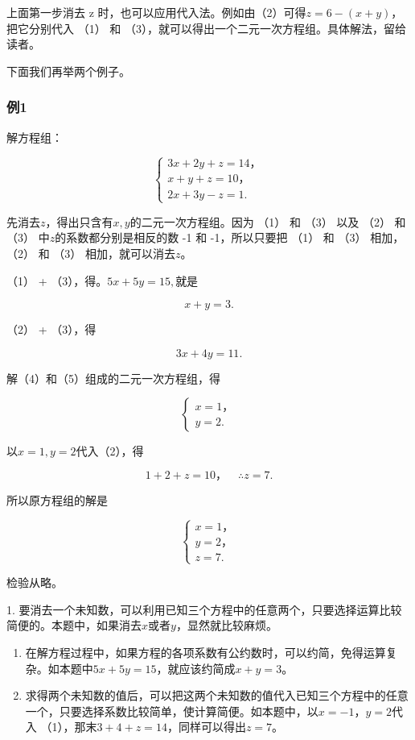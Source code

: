  上面第一步消去 z
时，也可以应用代入法。例如由（2）可得\(z=6-(x+y)\)，把它分别代入 （1）
和 （3），就可以得出一个二元一次方程组。具体解法，留给读者。

下面我们再举两个例子。

\subsubsection{例1}

解方程组：

\[
\left\{ \begin{array}{l} 3 x + 2 y + z = 14\text{，} \\ x + y + z = 10\text{，} \\ 2 x + 3 y - z = 1. \end{array} \right. \tag{1}
\]

 先消去\(z\)，得出只含有\(x, y\)的二元一次方程组。因为
（1） 和 （3） 以及 （2） 和 （3） 中\(z\)的系数都分别是相反的数 -1 和
-1，所以只要把 （1） 和 （3） 相加，（2） 和 （3）
相加，就可以消去\(z\)。

 （1） + （3），得。\(5x + 5y = 15,\)就是

\[
x + y = 3. \tag{4}
\]

（2） + （3），得

\[
3 x + 4 y = 11. \tag{5}
\]

解（4）和（5）组成的二元一次方程组，得

\[
\left\{ \begin{array}{l} x = 1\text{，} \\ y = 2. \end{array} \right.
\]

以\(x = 1, y = 2\)代入（2），得

\[
1 + 2 + z = 10\text{，} \quad \therefore z = 7.
\]

所以原方程组的解是

\[
\left\{ \begin{array}{l} x = 1\text{，} \\ y = 2\text{，} \\ z = 7. \end{array} \right.
\]

检验从略。

 1.
要消去一个未知数，可以利用已知三个方程中的任意两个，只要选择运算比较简便的。本题中，如果消去\(x\)或者\(y\)，显然就比较麻烦。

\begin{enumerate}[start=2]
\item
  在解方程过程中，如果方程的各项系数有公约数时，可以约简，免得运算复杂。如本题中\(5x + 5y = 15\)，就应该约简成\(x + y = 3\)。
\item
  求得两个未知数的值后，可以把这两个未知数的值代入已知三个方程中的任意一个，只要选择系数比较简单，使计算简便。如本题中，以\(x = -1\)，\(y = 2\)代入
  （1），那末\(3 + 4 + z = 14\)，同样可以得出\(z = 7\)。
\end{enumerate}

